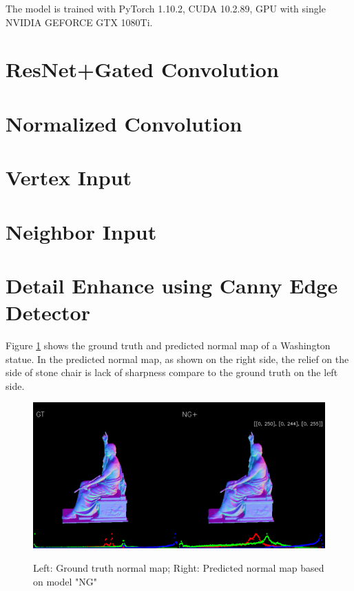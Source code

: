 The model is trained with PyTorch 1.10.2, CUDA 10.2.89, GPU with single NVIDIA GEFORCE GTX 1080Ti.


\section{ResNet+Gated Convolution}


\section{Normalized Convolution}



\section{Vertex Input}



\section{Neighbor Input}



\section{Detail Enhance using Canny Edge Detector}


Figure \ref{fig:washington_gt_ngpred} shows the ground truth and predicted normal map of a Washington statue. In the predicted normal map, as shown on the right side, the relief on the side of stone chair is lack of sharpness compare to the ground truth on the left side. 
\begin{figure}[!h]
	\centering
	{\includegraphics[width=\textwidth]{./pic/00349.gt.ngplus.png}}
	\label{fig:washington_gt_ngpred}
	\caption{Left: Ground truth normal map; Right: Predicted normal map based on model "NG"}
\end{figure}

